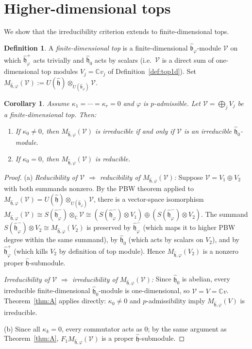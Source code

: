 \documentclass{amsart}
\newcommand{\Cx}{\mathbb{C}}
\newcommand{\h}{\mathfrak{h}}
\newcommand{\wh}[1]{\widehat{#1}}
\newcommand{\whh}{\wh{\h}}
\newtheorem{corollary}[theorem]{Corollary}
\theoremstyle{definition}
\newtheorem{definition}[theorem]{Definition}
\theoremstyle{remark}
\numberwithin{equation}{section}
\begin{document}
\section{Higher-dimensional tops}\label{sec:higher-tops}
We show that the irreducibility criterion extends to finite-dimensional
tops.
\begin{definition}\label{def:top-fd}
A \emph{finite-dimensional top} is a finite-dimensional
$\wh{\mathfrak b}_\varphi$-module $\mathcal{V}$ on which
$\whh_\varphi^+$ acts trivially and $\whh_0$ acts by scalars
(i.e.\ $\mathcal{V}$ is a direct sum of one-dimensional top modules
$V_j=\Cx v_j$ of Definition~\ref{def:top1d}).
Set $M_{\whh,\varphi}(\mathcal{V}):=U(\whh)\otimes_{U(\wh{\mathfrak
b}_\varphi)}\mathcal{V}$.
\end{definition}
\begin{corollary}\label{cor:higher-top}
Assume $\kappa_1=\cdots=\kappa_r=0$ and $\varphi$ is $p$-admissible.
Let $\mathcal{V}=\bigoplus_j V_j$ be a finite-dimensional top.  Then:
\begin{enumerate}[label=(\alph*)]
\item If $\kappa_0\neq0$, then $M_{\whh,\varphi}(\mathcal{V})$ is
  irreducible if and only if $\mathcal{V}$ is an irreducible
  $\whh_0$-module.
\item If $\kappa_0=0$, then $M_{\whh,\varphi}(\mathcal{V})$ is reducible.
\end{enumerate}
\end{corollary}
\begin{proof}
(a) \emph{Reducibility of $\mathcal V$ $\Rightarrow$ reducibility of
$M_{\whh,\varphi}(\mathcal V)$:}
Suppose $\mathcal V=V_1\oplus V_2$ with both summands nonzero.  By the PBW
theorem applied to $M_{\whh,\varphi}(\mathcal V)=U(\whh)\otimes_{U(\wh{\mathfrak b}_\varphi)}\mathcal V$,
there is a vector-space isomorphism
$M_{\whh,\varphi}(\mathcal V)\cong S(\whh_\varphi^-)\otimes_\Cx\mathcal V
\cong(S(\whh_\varphi^-)\otimes V_1)\oplus(S(\whh_\varphi^-)\otimes V_2)$.
The summand $S(\whh_\varphi^-)\otimes V_2\cong M_{\whh,\varphi}(V_2)$ is
preserved by $\whh_\varphi^-$ (which maps it to higher PBW degree within
the same summand), by $\whh_0$ (which acts by scalars on $V_2$), and by
$\whh_\varphi^+$ (which kills $V_2$ by definition of top module).  Hence
$M_{\whh,\varphi}(V_2)$ is a nonzero proper $\whh$-submodule.

\emph{Irreducibility of $\mathcal V$ $\Rightarrow$ irreducibility of
$M_{\whh,\varphi}(\mathcal V)$:}
Since $\whh_0$ is abelian, every irreducible finite-dimensional
$\whh_0$-module is one-dimensional, so $\mathcal V=V=\Cx v$.
Theorem~\ref{thm:A} applies directly: $\kappa_0\neq0$ and $p$-admissibility
imply $M_{\whh,\varphi}(V)$ is irreducible.

(b) Since all $\kappa_k=0$, every commutator acts as $0$; by the same
argument as Theorem~\ref{thm:A}, $F_1M_{\whh,\varphi}(\mathcal{V})$ is a
proper $\whh$-submodule.
\end{proof}
\end{document}
